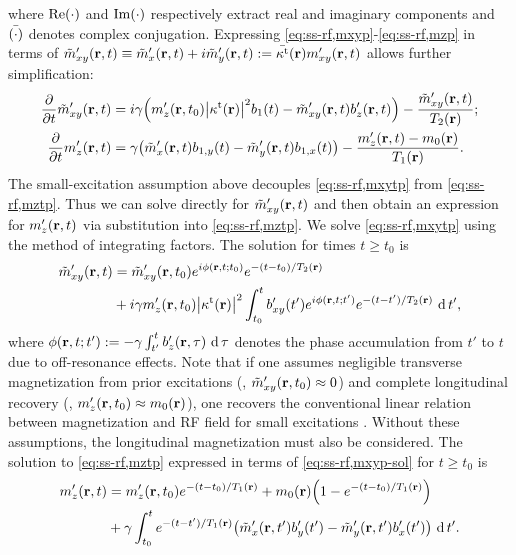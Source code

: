 where $\re{\cdot}$ and $\im{\cdot}$ 
respectively extract real and imaginary components
and $\bar{\paren{\cdot}}$ denotes complex conjugation.
Expressing \eqref{eq:ss-rf,mxyp}-\eqref{eq:ss-rf,mzp}
in terms of $\mxytp\prt \equiv \mxtp\prt + i\mytp\prt := \bar{\stx}\pr\mxyp\prt$
allows further simplification:
\begin{align}
	\dela{t} \mxytp\prt &= 
		i\gam \paren{\mzp\prtz \abs{\stx\pr}^2 \bone\pt - \mxytp\prt \bzp\prt}
			- \frac{\mxytp\prt}{\Tt\pr} ; 
		\label{eq:ss-rf,mxytp} \\
	\dela{t}{m}'_{z}\prt &= 
	\gam \paren{\mxtp\prt \boney\pt - \mytp\prt \bonex\pt} 
			- \frac{\mzp\prt - \mzero\pr}{\To\pr}. 
		\label{eq:ss-rf,mztp}
\end{align}
The small-excitation assumption above 
decouples \eqref{eq:ss-rf,mxytp} 
from \eqref{eq:ss-rf,mztp}.
Thus we can solve directly
for $\mxytp\prt$
and then obtain an expression for $\mzp\prt$
via substitution into \eqref{eq:ss-rf,mztp}.
We solve \eqref{eq:ss-rf,mxytp}
using the method of integrating factors.
The solution for times $t \geq t_0$ is
\begin{align}
		\mxytp\prt &= 
			\mxytp\prtz e^{i \phi\prtzt{t}} e^{-(t-t_0)/\Tt\pr} 
			\nonumber 
			\\
		&+ i \gam \mzp\prtz \abs{\stx\pr}^2 \int_{t_0}^t b_{xy}'(t') 
				e^{i \phi(\bmr, t; t')} e^{-(t-t')/\Tt\pr} \der t',
		\label{eq:ss-rf,mxyp-sol}
\end{align}
where $\phi(\mathbf{r}, t; t') := -\gamma \int_{t'}^t b_z'(\mathbf{r}, \tau) \,\operatorname{d}{\tau}$
denotes the phase accumulation 
from $t'$ to $t$ 
due to off-resonance effects.
Note that if one assumes negligible transverse magnetization
from prior excitations
(\ie, $\mxytp\prtz \approx 0$)
and complete longitudinal recovery
(\ie, $\mzp\prtz \approx \mzero\pr$),
one recovers the conventional linear relation
between magnetization and RF field
for small excitations \cite{pauly:89:aks}.
Without these assumptions,
the longitudinal magnetization 
must also be considered.
The solution to \eqref{eq:ss-rf,mztp}
expressed in terms of \eqref{eq:ss-rf,mxyp-sol}
for $t \geq t_0$ is
\begin{align}
	\mzp\prt &= 
		\mzp\prtz e^{-(t-t_0)/\To\pr} + \mzero\pr \paren{1 - e^{-(t-t_0)/\To\pr}}
		\nonumber \\
	&+ 
		\gam \int_{t_0}^t e^{-(t-t')/\To\pr} \paren{\tilde{m}_x'(\bmr, t') b_y'(t') - \tilde{m}_y'(\bmr, t') b_x'(t')} \der t'.
		\label{eq:ss-rf,mzp-sol}
\end{align}

